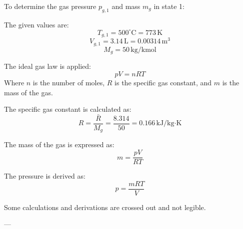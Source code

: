 To determine the gas pressure \( p_{g,1} \) and mass \( m_g \) in state 1:  

The given values are:  
\[
T_{g,1} = 500^\circ\text{C} = 773 \, \text{K}
\]
\[
V_{g,1} = 3.14 \, \text{L} = 0.00314 \, \text{m}^3
\]
\[
M_g = 50 \, \text{kg/kmol}
\]

The ideal gas law is applied:  
\[
pV = nRT
\]
Where \( n \) is the number of moles, \( R \) is the specific gas constant, and \( m \) is the mass of the gas.  

The specific gas constant is calculated as:  
\[
R = \frac{\bar{R}}{M_g} = \frac{8.314}{50} = 0.166 \, \text{kJ/kg·K}
\]

The mass of the gas is expressed as:  
\[
m = \frac{pV}{RT}
\]

The pressure is derived as:  
\[
p = \frac{mRT}{V}
\]

Some calculations and derivations are crossed out and not legible.  

---